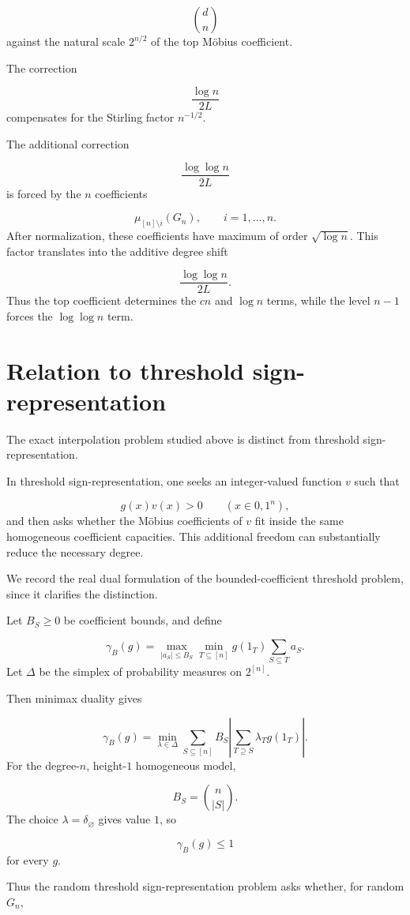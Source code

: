 \documentclass[11pt]{article}
\theoremstyle{definition}
\begin{document}
\[
\binom dn
\]
against the natural scale $2^{n/2}$ of the top Möbius coefficient.

The correction

\[
\frac{\log n}{2L}
\]
compensates for the Stirling factor $n^{-1/2}$.

The additional correction

\[
\frac{\log\log n}{2L}
\]
is forced by the $n$ coefficients

\[
\mu_{[n]\setminus{i}}(G_n),
\qquad i=1,\dots,n.
\]
After normalization, these coefficients have maximum of order $\sqrt{\log n}$. This factor translates into the additive degree shift

\[
\frac{\log\log n}{2L}.
\]
Thus the top coefficient determines the $cn$ and $\log n$ terms, while the level $n-1$ forces the $\log\log n$ term.

\section{Relation to threshold sign-representation}
The exact interpolation problem studied above is distinct from threshold sign-representation.

In threshold sign-representation, one seeks an integer-valued function $v$ such that

\[
g(x)v(x)>0
\qquad(x\in{0,1}^n),
\]
and then asks whether the Möbius coefficients of $v$ fit inside the same homogeneous coefficient capacities. This additional freedom can substantially reduce the necessary degree.

We record the real dual formulation of the bounded-coefficient threshold problem, since it clarifies the distinction.

Let $B_S\ge0$ be coefficient bounds, and define

\[
\gamma_B(g)
=
\max_{|a_S|\le B_S}
\min_{T\subseteq[n]}
g(1_T)\sum_{S\subseteq T}a_S.
\]
Let $\Delta$ be the simplex of probability measures on $2^{[n]}$.

Then minimax duality gives

\[
\gamma_B(g)
=
\min_{\lambda\in\Delta}
\sum_{S\subseteq[n]}
B_S
\left|
\sum_{T\supseteq S}
\lambda_Tg(1_T)
\right|.
\]
For the degree-$n$, height-$1$ homogeneous model,

\[
B_S=\binom n{|S|}.
\]
The choice $\lambda=\delta_\varnothing$ gives value $1$, so

\[
\gamma_B(g)\le1
\]
for every $g$.

Thus the random threshold sign-representation problem asks whether, for random $G_n$,
\end{document}
